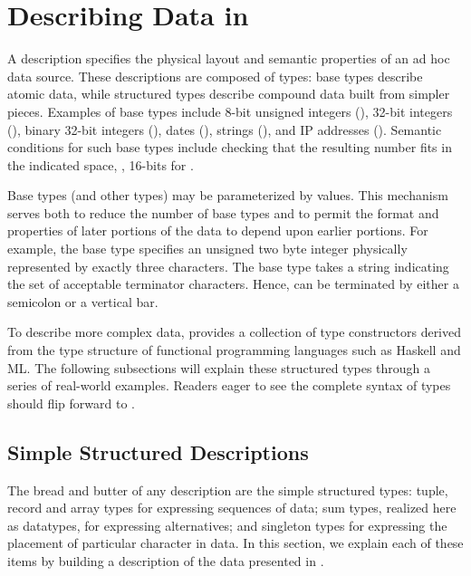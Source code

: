 \section{Describing Data in \datatype{}}
\label{sec:data-description}

A \datatype{} description specifies the physical layout and semantic
properties of an ad hoc data source.  
These descriptions are composed of types: 
base types describe atomic data, while structured
types describe compound data built from simpler pieces.  Examples of
base types include 8-bit unsigned integers (), 32-bit
integers (), binary 32-bit integers (), dates
(), strings (), and IP addresses ().
Semantic conditions for such base types include checking that the
resulting number fits in the indicated space, \ie, 16-bits for
.

Base types (and other types) may be parameterized by values.  This
mechanism serves both to reduce the number of base types and to permit
the format and properties of later portions of the data to depend upon
earlier portions.  For example, the base type 
specifies an unsigned two byte integer physically represented by
exactly three characters. The base type  takes 
a string indicating the set of acceptable terminator characters. Hence, 
 can be terminated by either a semicolon or a
vertical bar.


To describe more complex data, \datatype{} provides a collection of
type constructors derived from the type structure of functional
programming languages such as Haskell and ML.  The following
subsections will explain these structured types through a series 
of real-world examples.  Readers eager to see the complete syntax
of types should flip forward to .

\subsection{Simple Structured Descriptions}

The bread and butter of any \datatype{} description are the
simple structured types: tuple, record and array types for expressing
sequences of data; sum types, realized here as datatypes, for
expressing alternatives; and singleton types for expressing
the placement of particular character in data.  In this section, we
explain each of these items by building a description 
of the \dibbler{} data presented in .

